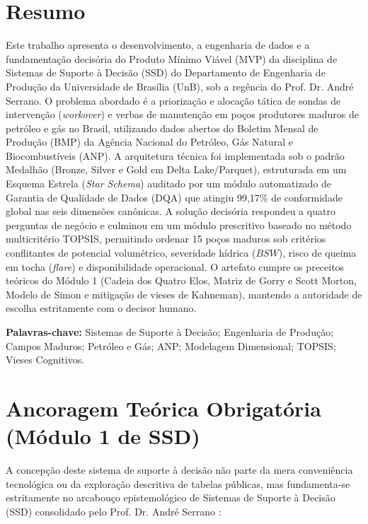 \documentclass[12pt,a4paper]{article}
\begin{document}
\section*{Resumo}
Este trabalho apresenta o desenvolvimento, a engenharia de dados e a fundamentação decisória do Produto Mínimo Viável (MVP) da disciplina de Sistemas de Suporte à Decisão (SSD) do Departamento de Engenharia de Produção da Universidade de Brasília (UnB), sob a regência do Prof. Dr. André Serrano. O problema abordado é a priorização e alocação tática de sondas de intervenção (\textit{workover}) e verbas de manutenção em poços produtores maduros de petróleo e gás no Brasil, utilizando dados abertos do Boletim Mensal de Produção (BMP) da Agência Nacional do Petróleo, Gás Natural e Biocombustíveis (ANP). A arquitetura técnica foi implementada sob o padrão Medalhão (Bronze, Silver e Gold em Delta Lake/Parquet), estruturada em um Esquema Estrela (\textit{Star Schema}) auditado por um módulo automatizado de Garantia de Qualidade de Dados (DQA) que atingiu 99,17\% de conformidade global nas seis dimensões canônicas. A solução decisória respondeu a quatro perguntas de negócio e culminou em um módulo prescritivo baseado no método multicritério TOPSIS, permitindo ordenar 15 poços maduros sob critérios conflitantes de potencial volumétrico, severidade hídrica ($BSW$), risco de queima em tocha (\textit{flare}) e disponibilidade operacional. O artefato cumpre os preceitos teóricos do Módulo 1 (Cadeia dos Quatro Elos, Matriz de Gorry e Scott Morton, Modelo de Simon e mitigação de vieses de Kahneman), mantendo a autoridade de escolha estritamente com o decisor humano.

\noindent\textbf{Palavras-chave:} Sistemas de Suporte à Decisão; Engenharia de Produção; Campos Maduros; Petróleo e Gás; ANP; Modelagem Dimensional; TOPSIS; Vieses Cognitivos.

\newpage
\tableofcontents
\newpage

\section{Ancoragem Teórica Obrigatória (Módulo 1 de SSD)}

A concepção deste sistema de suporte à decisão não parte da mera conveniência tecnológica ou da exploração descritiva de tabelas públicas, mas fundamenta-se estritamente no arcabouço epistemológico de Sistemas de Suporte à Decisão (SSD) consolidado pelo Prof. Dr. André Serrano \cite{serrano2026}:
\end{document}
